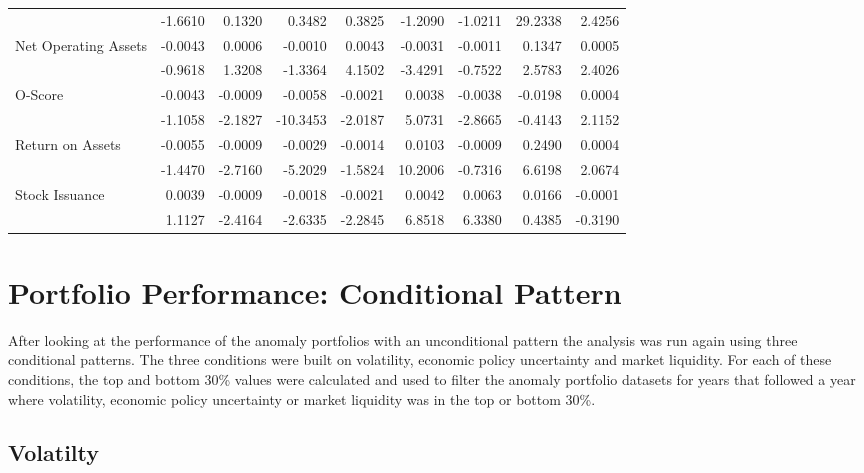 \documentclass[a4paper]{article}                 %
\begin{document}
\begin{table}[h]
{\begin{tabular}{@{}lrrrrrrrr@{}}
     & -1.6610 & 0.1320 & 0.3482 & 0.3825 & -1.2090 & -1.0211 & 29.2338 & 2.4256 \\
    \multirow{2}{*}{Net Operating Assets} & -0.0043 & 0.0006 & -0.0010 & 0.0043 & -0.0031 & -0.0011 & 0.1347 & 0.0005 \\
     & -0.9618 & 1.3208 & -1.3364 & 4.1502 & -3.4291 & -0.7522 & 2.5783 & 2.4026 \\
    \multirow{2}{*}{O-Score} & -0.0043 & -0.0009 & -0.0058 & -0.0021 & 0.0038 & -0.0038 & -0.0198 & 0.0004 \\
     & -1.1058 & -2.1827 & -10.3453 & -2.0187 & 5.0731 & -2.8665 & -0.4143 & 2.1152 \\
    \multirow{2}{*}{Return on Assets} & -0.0055 & -0.0009 & -0.0029 & -0.0014 & 0.0103 & -0.0009 & 0.2490 & 0.0004 \\
     & -1.4470 & -2.7160 & -5.2029 & -1.5824 & 10.2006 & -0.7316 & 6.6198 & 2.0674 \\
    \multirow{2}{*}{Stock Issuance} & 0.0039 & -0.0009 & -0.0018 & -0.0021 & 0.0042 & 0.0063 & 0.0166 & -0.0001 \\
     & 1.1127 & -2.4164 & -2.6335 & -2.2845 & 6.8518 & 6.3380 & 0.4385 & -0.3190 \\ \bottomrule
    \end{tabular}%
    }
    \end{table}


\section{Portfolio Performance: Conditional Pattern}
After looking at the performance of the anomaly portfolios with an unconditional pattern the analysis was run again using three conditional patterns. The three conditions were built on volatility, economic policy uncertainty and market liquidity. For each of these conditions, the top and bottom 30\% values were calculated and used to filter the anomaly portfolio datasets for years that followed a year where volatility, economic policy uncertainty or market liquidity was in the top or bottom 30\%.

\subsection{Volatilty}
\end{document}
